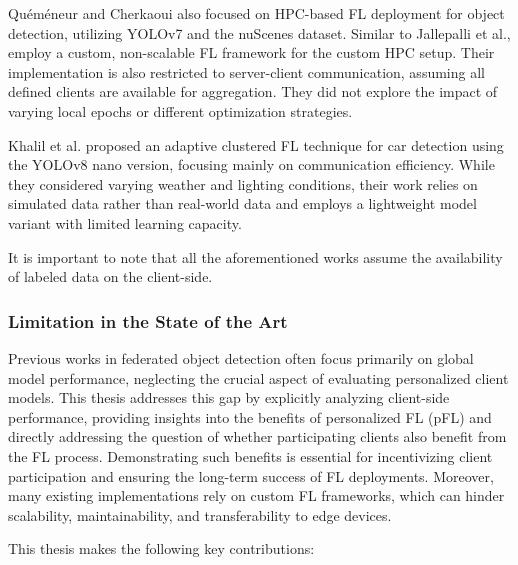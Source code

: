 \documentclass[thesis]{mas_proposal}
\begin{document}
Quéméneur and Cherkaoui \cite{quemeneur2024fedpylot} also focused on HPC-based FL deployment for object detection, utilizing YOLOv7 and the nuScenes dataset. Similar to Jallepalli et al., employ a custom, non-scalable FL framework for the custom HPC setup. Their implementation is also restricted to server-client communication, assuming all defined clients are available for aggregation. They did not explore the impact of varying local epochs or different optimization strategies.

Khalil et al. \cite{khalil2024driving} proposed an adaptive clustered FL technique for car detection using the YOLOv8 nano version, focusing mainly on communication efficiency. While they considered varying weather and lighting conditions, their work relies on simulated data rather than real-world data and employs a lightweight model variant with limited learning capacity.

It is important to note that all the aforementioned works assume the availability of labeled data on the client-side.

\subsubsection{Limitation in the State of the Art}

\indent \indent Previous works in federated object detection often focus primarily on global model performance, neglecting the crucial aspect of evaluating personalized client models. This thesis addresses this gap by explicitly analyzing client-side performance, providing insights into the benefits of personalized FL (pFL) and directly addressing the question of whether participating clients also benefit from the FL process. Demonstrating such benefits is essential for incentivizing client participation and ensuring the long-term success of FL deployments. Moreover, many existing implementations rely on custom FL frameworks, which can hinder scalability, maintainability, and transferability to edge devices.
    
This thesis makes the following key contributions:
\end{document}
